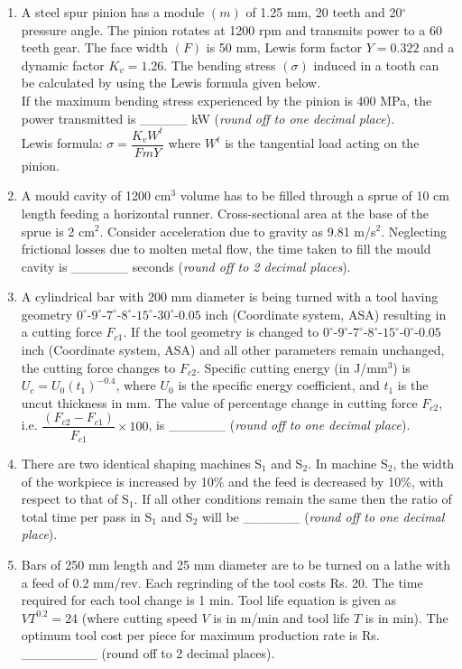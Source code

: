\documentclass[12pt,onecolumn]{article}
\begin{document}
\begin{enumerate}
    \item A steel spur pinion has a module $(m)$ of 1.25 mm, 20 teeth and 20$^\circ$ pressure angle. The pinion rotates at 1200 rpm and transmits power to a 60 teeth gear. The face width $(F)$ is 50 mm, Lewis form factor $Y = 0.322$ and a dynamic factor $K_v = 1.26$. The bending stress $(\sigma)$ induced in a tooth can be calculated by using the Lewis formula given below.\\
          If the maximum bending stress experienced by the pinion is 400 MPa, the power transmitted is \_\_\_\_\_ kW (\textit{round off to one decimal place}).\\
          Lewis formula: $\sigma = \dfrac{K_v W^t}{F m Y}$ where $W^t$ is the tangential load acting on the pinion.

    \item A mould cavity of 1200 cm$^3$ volume has to be filled through a sprue of 10 cm length feeding a horizontal runner. Cross-sectional area at the base of the sprue is 2 cm$^2$. Consider acceleration due to gravity as 9.81 m/s$^2$. Neglecting frictional losses due to molten metal flow, the time taken to fill the mould cavity is \_\_\_\_\_\_ seconds (\textit{round off to 2 decimal places}).

    \item A cylindrical bar with 200 mm diameter is being turned with a tool having geometry $0^\circ$-$9^\circ$-$7^\circ$-$8^\circ$-$15^\circ$-$30^\circ$-$0.05$ inch (Coordinate system, ASA) resulting in a cutting force $F_{c1}$. If the tool geometry is changed to $0^\circ$-$9^\circ$-$7^\circ$-$8^\circ$-$15^\circ$-$0^\circ$-$0.05$ inch (Coordinate system, ASA) and all other parameters remain unchanged, the cutting force changes to $F_{c2}$. Specific cutting energy (in J/mm$^3$) is $U_c = U_0 (t_1)^{-0.4}$, where $U_0$ is the specific energy coefficient, and $t_1$ is the uncut thickness in mm. The value of percentage change in cutting force $F_{c2}$, i.e. $\dfrac{(F_{c2}-F_{c1})}{F_{c1}} \times 100$, is \_\_\_\_\_\_ (\textit{round off to one decimal place}).

    \item There are two identical shaping machines S$_1$ and S$_2$. In machine S$_2$, the width of the workpiece is increased by 10\% and the feed is decreased by 10\%, with respect to that of S$_1$. If all other conditions remain the same then the ratio of total time per pass in S$_1$ and S$_2$ will be \_\_\_\_\_\_ (\textit{round off to one decimal place}).

    \item Bars of 250 mm length and 25 mm diameter are to be turned on a lathe with a feed of 0.2 mm/rev. Each regrinding of the tool costs Rs. 20. The time required for each tool change is 1 min. Tool life equation is given as $VT^{0.2} = 24$ (where cutting speed $V$ is in m/min and tool life $T$ is in min). The optimum tool cost per piece for maximum production rate is Rs. \_\_\_\_\_\_\_\_ (round off to 2 decimal places).


\end{enumerate}
\end{document}
